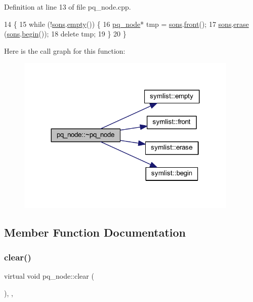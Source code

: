 Definition at line 13 of file pq\+\_\+node.\+cpp.


\begin{DoxyCode}
14 \{
15     \textcolor{keywordflow}{while} (!\mbox{\hyperlink{classpq__node_a2cc030cfa4560872acea8b50ebd0542b}{sons}}.\mbox{\hyperlink{classsymlist_aca11cd6c621376bc52a18828ef92e753}{empty}}()) \{
16     \mbox{\hyperlink{classpq__node}{pq\_node}}* tmp = \mbox{\hyperlink{classpq__node_a2cc030cfa4560872acea8b50ebd0542b}{sons}}.\mbox{\hyperlink{classsymlist_afd4b55616fc20033d4a47684551866e8}{front}}();
17     \mbox{\hyperlink{classpq__node_a2cc030cfa4560872acea8b50ebd0542b}{sons}}.\mbox{\hyperlink{classsymlist_a75fc1fc7db7b20cc430ddb8577608904}{erase}} (\mbox{\hyperlink{classpq__node_a2cc030cfa4560872acea8b50ebd0542b}{sons}}.\mbox{\hyperlink{classsymlist_a525b8d44af5d771fe15916372515cce0}{begin}}());
18     \textcolor{keyword}{delete} tmp;
19     \}
20 \}
\end{DoxyCode}
Here is the call graph for this function\+:\nopagebreak
\begin{figure}[H]
\begin{center}
\leavevmode
\includegraphics[width=299pt]{classpq__node_ad23fe1826e949ceb746c37426bc1f8b4_cgraph}
\end{center}
\end{figure}


\subsection{Member Function Documentation}
\mbox{\label{classpq__node_a13100e0b030cc047f382d9ddf6a44f4a}} 
\subsubsection{\texorpdfstring{clear()}{clear()}}
{\footnotesize\ttfamily virtual void pq\+\_\+node\+::clear (\begin{DoxyParamCaption}{ }\end{DoxyParamCaption})\hspace{0.3cm}{\ttfamily [inline]}, {\ttfamily [protected]}, {\ttfamily [virtual]}}



